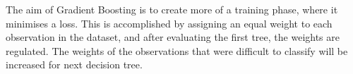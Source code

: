 The aim of Gradient Boosting is to create more of a training phase, where it minimises a loss. This is accomplished by assigning an equal weight to each observation in the dataset, and after evaluating the first tree, the weights are regulated. The weights of the observations that were difficult to classify will be increased for next decision tree.\cite[Chapter~12]{GradientBoosting}













